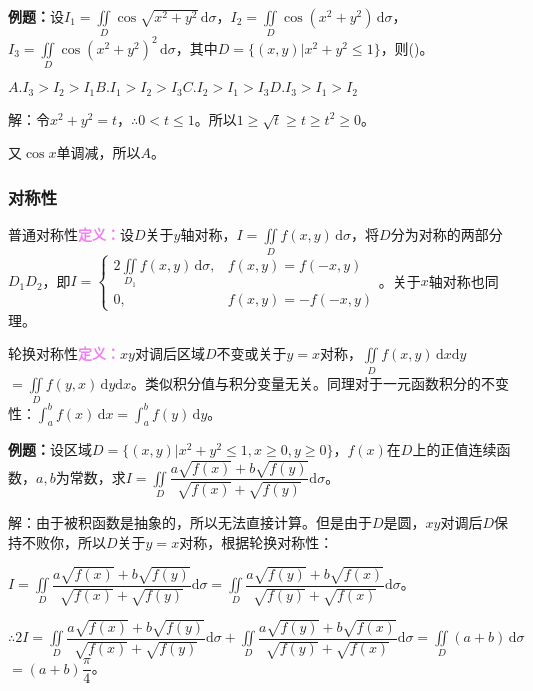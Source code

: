\documentclass[UTF8, 12pt]{ctexart}
\begin{document}
\textbf{例题：}设$I_1=\iint\limits_D\cos\sqrt{x^2+y^2}\,\textrm{d}\sigma$，$I_2=\iint\limits_D\cos(x^2+y^2)\,\textrm{d}\sigma$，$I_3=\iint\limits_D\cos(x^2+y^2)^2\,\textrm{d}\sigma$，其中$D=\{(x,y)|x^2+y^2\leqslant1\}$，则()。

$A.I_3>I_2>I_1$\qquad$B.I_1>I_2>I_3$\qquad$C.I_2>I_1>I_3$\qquad$D.I_3>I_1>I_2$

解：令$x^2+y^2=t$，$\therefore0<t\leqslant1$。所以$1\geqslant\sqrt{t}\geqslant t\geqslant t^2\geqslant0$。

又$\cos x$单调减，所以$A$。

\subsubsection{对称性}

普通对称性\textcolor{violet}{\textbf{定义：}}设$D$关于$y$轴对称，$I=\iint\limits_Df(x,y)\,\textrm{d}\sigma$，将$D$分为对称的两部分$D_1D_2$，即$I=\left\{\begin{array}{ll}
    2\iint\limits_{D_1}f(x,y)\,\textrm{d}\sigma, & f(x,y)=f(-x,y) \\
    0, & f(x,y)=-f(-x,y)
\end{array}\right.$。关于$x$轴对称也同理。

轮换对称性\textcolor{violet}{\textbf{定义：}}$xy$对调后区域$D$不变或关于$y=x$对称，$\iint\limits_Df(x,y)\,\textrm{d}x\textrm{d}y$\\$=\iint\limits_Df(y,x)\,\textrm{d}y\textrm{d}x$。类似积分值与积分变量无关。同理对于一元函数积分的不变性：$\int_a^bf(x)\,\textrm{d}x=\int_a^bf(y)\,\textrm{d}y$。

\textbf{例题：}设区域$D=\{(x,y)|x^2+y^2\leqslant1,x\geqslant0,y\geqslant0\}$，$f(x)$在$D$上的正值连续函数，$a,b$为常数，求$I=\displaystyle{\iint\limits_D\dfrac{a\sqrt{f(x)}+b\sqrt{f(y)}}{\sqrt{f(x)}+\sqrt{f(y)}}\textrm{d}\sigma}$。

解：由于被积函数是抽象的，所以无法直接计算。但是由于$D$是圆，$xy$对调后$D$保持不败你，所以$D$关于$y=x$对称，根据轮换对称性：\medskip

$I=\displaystyle{\iint\limits_D\dfrac{a\sqrt{f(x)}+b\sqrt{f(y)}}{\sqrt{f(x)}+\sqrt{f(y)}}\textrm{d}\sigma=\iint\limits_D\dfrac{a\sqrt{f(y)}+b\sqrt{f(x)}}{\sqrt{f(y)}+\sqrt{f(x)}}\textrm{d}\sigma}$。

$\therefore2I=\displaystyle{\iint\limits_D\dfrac{a\sqrt{f(x)}+b\sqrt{f(y)}}{\sqrt{f(x)}+\sqrt{f(y)}}\textrm{d}\sigma+\iint\limits_D\dfrac{a\sqrt{f(y)}+b\sqrt{f(x)}}{\sqrt{f(y)}+\sqrt{f(x)}}\textrm{d}\sigma}=\iint\limits_D(a+b)\,\textrm{d}\sigma$\\$=(a+b)\dfrac{\pi}{4}$。
\end{document}
